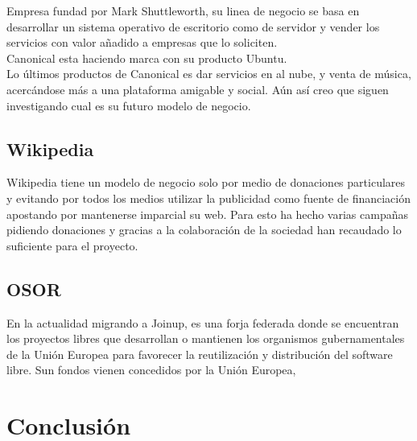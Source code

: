 \documentclass[12pt]{article} %
\begin{document}
Empresa fundad por Mark Shuttleworth, su linea de negocio se basa en desarrollar un sistema operativo de escritorio como de servidor y vender los servicios con valor añadido a empresas que lo soliciten.\\Canonical esta haciendo marca con su producto Ubuntu.\\Lo últimos productos de Canonical es dar servicios en al nube, y venta de música, acercándose más a una plataforma amigable y social. Aún así creo que siguen investigando cual es su futuro modelo de negocio.
\subsection{Wikipedia} %

Wikipedia tiene un modelo de negocio solo por medio de donaciones particulares y evitando por todos los medios utilizar la publicidad como fuente de financiación  apostando por mantenerse imparcial su web. Para esto ha hecho varias campañas pidiendo donaciones y gracias a la colaboración de la sociedad han recaudado lo suficiente para el proyecto.

\subsection{OSOR} %

En la actualidad migrando a Joinup, es una forja federada donde se encuentran los proyectos libres que desarrollan o mantienen los organismos gubernamentales de la Unión Europea para favorecer la reutilización y distribución del software libre. Sun fondos vienen concedidos por la Unión Europea, 

\section{Conclusión}  
\end{document}
